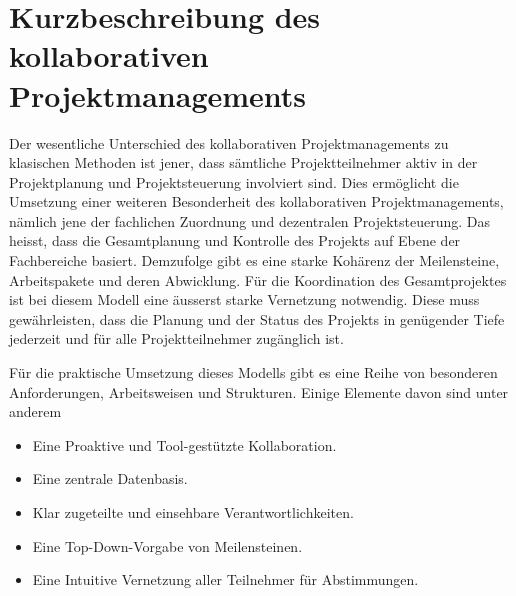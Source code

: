 \section{Kurzbeschreibung des kollaborativen Projektmanagements}
Der wesentliche Unterschied des kollaborativen Projektmanagements zu
klasischen Methoden ist jener, dass sämtliche Projektteilnehmer aktiv
in der Projektplanung und Projektsteuerung involviert sind. Dies
ermöglicht die Umsetzung einer weiteren Besonderheit des kollaborativen
Projektmanagements, nämlich jene der fachlichen Zuordnung und dezentralen
Projektsteuerung. Das heisst, dass die Gesamtplanung und Kontrolle des
Projekts auf Ebene der Fachbereiche basiert. Demzufolge gibt es eine starke
Kohärenz der Meilensteine, Arbeitspakete und deren Abwicklung. Für die
Koordination des Gesamtprojektes ist bei diesem Modell eine äusserst
starke Vernetzung notwendig. Diese muss gewährleisten, dass die Planung
und der Status des Projekts in genügender Tiefe jederzeit und für alle
Projektteilnehmer zugänglich ist.

Für die praktische Umsetzung dieses Modells gibt es eine Reihe von
besonderen Anforderungen, Arbeitsweisen und Strukturen. Einige Elemente
davon sind unter anderem

\begin{itemize}
	\item Eine Proaktive und Tool-gestützte Kollaboration.
	\item Eine zentrale Datenbasis.
	\item Klar zugeteilte und einsehbare Verantwortlichkeiten.
	\item Eine Top-Down-Vorgabe von Meilensteinen.
	\item Eine Intuitive Vernetzung aller Teilnehmer für Abstimmungen.
\end{itemize}
